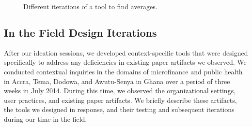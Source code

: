 \documentclass{sig-alternate}
\begin{document}
\begin{figure}%
    \centering
    \qquad
    \qquad
    \caption{Different iterations of a tool to find averages.}%
    \label{fig:avg}
\end{figure}

\subsection{In the Field Design Iterations}

After our ideation sessions, we developed context-specific tools that were designed specifically to address any deficiencies in existing paper artifacts we observed. We conducted contextual inquiries in the domains of microfinance and public health in Accra, Tema, Dodowa, and Awutu-Senya in Ghana over a period of three weeks in July 2014. During this time, we observed the organizational settings, user practices, and existing paper artifacts. We briefly describe these artifacts, the tools we designed in response, and their testing and subsequent iterations during our time in the field.
\end{document}
